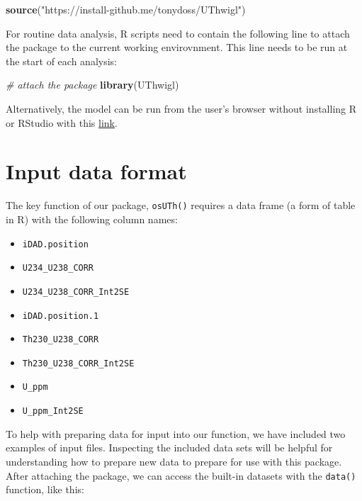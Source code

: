 \documentclass[]{elsarticle} %
\providecommand{\tightlist}{%
  \setlength{\itemsep}{0pt}\setlength{\parskip}{0pt}}
\newenvironment{Shaded}{\begin{snugshade}}{\end{snugshade}}
\newcommand{\CommentTok}[1]{\textcolor[rgb]{0.56,0.35,0.01}{\textit{#1}}}
\newcommand{\KeywordTok}[1]{\textcolor[rgb]{0.13,0.29,0.53}{\textbf{#1}}}
\newcommand{\NormalTok}[1]{#1}
\newcommand{\StringTok}[1]{\textcolor[rgb]{0.31,0.60,0.02}{#1}}
\begin{document}
\begin{Shaded}
\begin{Highlighting}[]
\KeywordTok{source}\NormalTok{(}\StringTok{"https://install-github.me/tonydoss/UThwigl"}\NormalTok{)}
\end{Highlighting}
\end{Shaded}

For routine data analysis, R scripts need to contain the following line to attach the package to the current working envirovnment. This line needs to be run at the start of each analysis:

\begin{Shaded}
\begin{Highlighting}[]
\CommentTok{# attach the package}
\KeywordTok{library}\NormalTok{(UThwigl)}
\end{Highlighting}
\end{Shaded}

Alternatively, the model can be run from the user's browser without installing R or RStudio with this \href{https://mybinder.org/v2/gh/benmarwick/UThwigl/master?urlpath=rstudio}{link}.

\newpage

\hypertarget{input-data-format}{%
\section{Input data format}\label{input-data-format}}

The key function of our package, \texttt{osUTh()} requires a data frame (a form of table in R) with the following column names:

\begin{itemize}
\tightlist
\item
  \texttt{iDAD.position}
\item
  \texttt{U234\_U238\_CORR}
\item
  \texttt{U234\_U238\_CORR\_Int2SE}
\item
  \texttt{iDAD.position.1}
\item
  \texttt{Th230\_U238\_CORR}
\item
  \texttt{Th230\_U238\_CORR\_Int2SE}
\item
  \texttt{U\_ppm}
\item
  \texttt{U\_ppm\_Int2SE}
\end{itemize}

To help with preparing data for input into our function, we have included two examples of input files. Inspecting the included data sets will be helpful for understanding how to prepare new data to prepare for use with this package. After attaching the package, we can access the built-in datasets with the \texttt{data()} function, like this:
\end{document}
